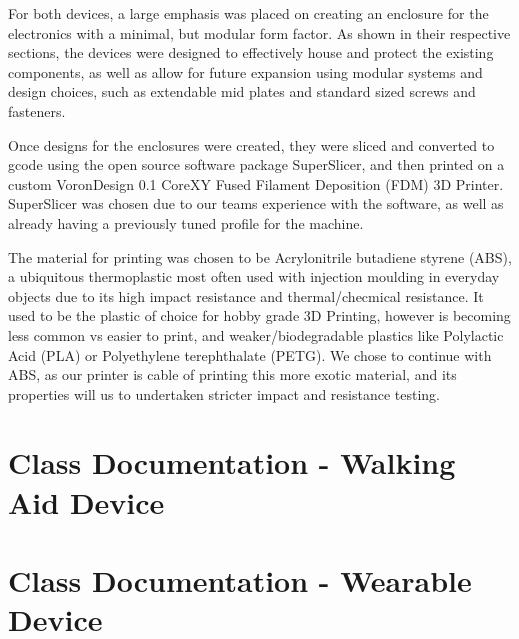             For both devices, a large emphasis was placed on creating an enclosure for the electronics with a minimal, but modular form factor. As shown in their respective sections, the devices were designed to effectively house and protect the existing components, as well as allow for future expansion using modular systems and design choices, such as extendable mid plates and standard sized screws and fasteners.

            Once designs for the enclosures were created, they were sliced and converted to gcode using the open source software package SuperSlicer, and then printed on a custom VoronDesign 0.1 CoreXY Fused Filament Deposition (FDM) 3D Printer. SuperSlicer was chosen due to our teams experience with the software, as well as already having a previously tuned profile for the machine.

            The material for printing was chosen to be Acrylonitrile butadiene styrene (ABS), a ubiquitous thermoplastic most often used with injection moulding in everyday objects due to its high impact resistance and thermal/checmical resistance. It used to be the plastic of choice for hobby grade 3D Printing, however is becoming less common vs easier to print, and weaker/biodegradable plastics like Polylactic Acid (PLA) or Polyethylene terephthalate (PETG). We chose to continue with ABS, as our printer is cable of printing this more exotic material, and its properties will us to undertaken stricter impact and resistance testing.             
        
    \newpage

    \section{Class Documentation - Walking Aid Device}
    \label{sec:class_documentation_walk_aid}\mbox{}

        
        \newpage
        
        \newpage
        
        \newpage
        
        \newpage
        
        \newpage
        
        \newpage

    \section{Class Documentation - Wearable Device}
    \label{sec:class_documentation_wearable}\mbox{}

        
        \newpage
        
        \newpage
        
        \newpage
        
        \newpage